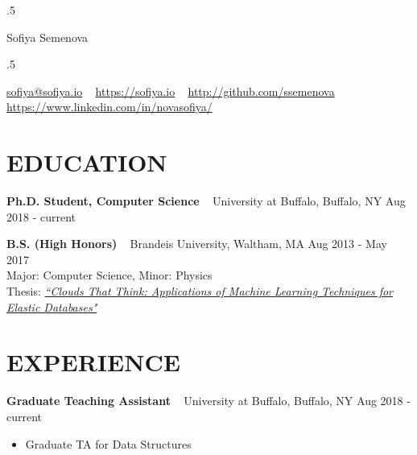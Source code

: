 \documentclass{res}
\begin{document}
 \moveleft.5\hoffset\centerline{\namefont Sofiya Semenova}
 \smallskip
 \moveleft.5\hoffset\centerline{\href{sofiya@sofiya.io}{sofiya@sofiya.io} ~ \href{https://sofiya.io}{https://sofiya.io} ~ \href{http://github.com/ssemenova}{http://github.com/ssemenova} ~ \href{https://www.linkedin.com/in/novasofiya/}{https://www.linkedin.com/in/novasofiya/}}


\vspace{-3mm}

\begin{resume}


\section{EDUCATION}

\textbf{Ph.D. Student, Computer Science} ~ University at Buffalo, Buffalo, NY \hfill Aug 2018 - current

\textbf{B.S. (High Honors)} ~ Brandeis University, Waltham, MA \hfill Aug 2013 - May 2017 \\
	Major: Computer Science, Minor: Physics \\
	Thesis: \href{https://sofiya.io/media/thesis.pdf}{\sl “Clouds That Think: Applications of Machine Learning Techniques for Elastic Databases"}

\section{EXPERIENCE}

\textbf{Graduate Teaching Assistant} ~ University at Buffalo, Buffalo, NY \hfill Aug 2018 - current \\ 
	\begin{itemize}  \itemsep -2pt %
	\item Graduate TA for Data Structures
	\end{itemize}


\end{resume}
\end{document}
